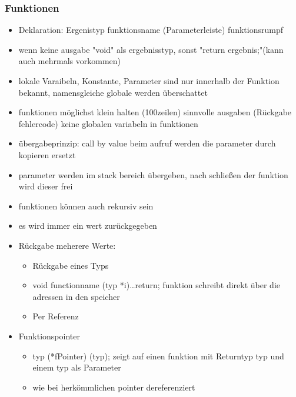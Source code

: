 \documentclass[10pt,a5paper]{article}
\begin{document}
\subsubsection{Funktionen}
\begin{itemize}
\item Deklaration: Ergenistyp funktionsname (Parameterleiste) {funktionsrumpf}
\item wenn keine ausgabe "void" als ergebnisstyp, sonst "return ergebnis;"(kann auch mehrmals vorkommen)
\item lokale Varaibeln, Konstante, Parameter sind nur innerhalb der Funktion bekannt, namensgleiche globale werden überschattet
\item funktionen möglichst klein halten (100zeilen) sinnvolle ausgaben (Rückgabe fehlercode) keine globalen variabeln in funktionen
\item übergabeprinzip: call by value beim aufruf werden die parameter durch kopieren ersetzt
\item parameter werden im stack bereich übergeben, nach schließen der funktion wird dieser frei
\item funktionen können auch rekursiv sein
\item es wird immer ein wert zurückgegeben
\item Rückgabe meherere Werte:\begin{itemize}
\item Rückgabe eines Typs
\item void functionname (typ *i){\dots return;} funktion schreibt direkt über die adressen in den speicher
\item Per Referenz
\end{itemize}
\item Funktionspointer\begin{itemize}
\item typ (*fPointer) (typ); zeigt auf einen funktion mit Returntyp typ und einem typ als Parameter
\item wie bei herkömmlichen pointer dereferenziert
\end{itemize}
\end{itemize}
\end{document}
